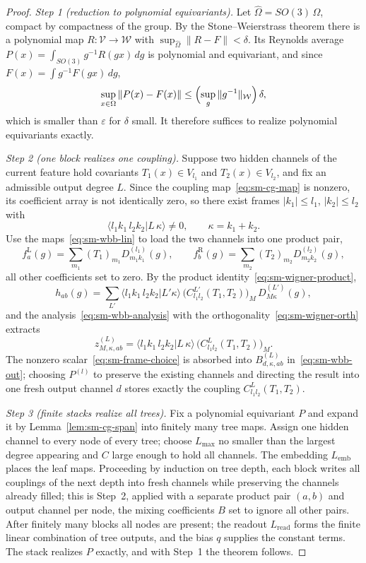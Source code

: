 \begin{proof}
    \emph{Step 1 (reduction to polynomial equivariants).}
    Let $\widehat\Omega=SO(3)\,\Omega$, compact by compactness of the group.
    By the Stone--Weierstrass theorem there is a polynomial map $R:\mathcal{V}\to\mathcal{W}$ with $\sup_{\widehat\Omega}\|R-F\|<\delta$.
    Its Reynolds average $P(x)=\int_{SO(3)}g^{-1}R(gx)\,dg$ is polynomial and equivariant, and since $F(x)=\int g^{-1}F(gx)\,dg$, \[ \sup_{x\in\Omega}\|P(x)-F(x)\| \le \Bigl(\sup_{g}\|g^{-1}\|_{\mathcal{W}}\Bigr)\,\delta , \] which is smaller than $\varepsilon$ for $\delta$ small.
    It therefore suffices to realize polynomial equivariants exactly.

    \emph{Step 2 (one block realizes one coupling).}
    Suppose two hidden channels of the current feature hold covariants $T_1(x)\in V_{l_1}$ and $T_2(x)\in V_{l_2}$, and fix an admissible output degree $L$.
    Since the coupling map~\eqref{eq:sm-cg-map} is nonzero, its coefficient array is not identically zero, so there exist frames $|k_1|\le l_1$, $|k_2|\le l_2$ with
    \begin{equation}
        \langle l_1 k_1\, l_2 k_2|L\,\kappa\rangle\neq0,
        \qquad \kappa=k_1+k_2 .
        \label{eq:sm-frame-choice}
    \end{equation}
    Use the maps~\eqref{eq:sm-wbb-lin} to load the two channels into one product pair, \[ f^{\mathrm{L}}_{a}(g)=\sum_{m_1}(T_1)_{m_1}D^{(l_1)}_{m_1k_1}(g), \qquad f^{\mathrm{R}}_{b}(g)=\sum_{m_2}(T_2)_{m_2}D^{(l_2)}_{m_2k_2}(g), \] all other coefficients set to zero.
    By the product identity~\eqref{eq:sm-wigner-product}, \[ h_{ab}(g) =\sum_{L'}\langle l_1 k_1\, l_2 k_2|L'\kappa\rangle\, \bigl(C^{L'}_{l_1l_2}(T_1,T_2)\bigr)_{M}\,D^{(L')}_{M\kappa}(g), \] and the analysis~\eqref{eq:sm-wbb-analysis} with the orthogonality~\eqref{eq:sm-wigner-orth} extracts \[ z^{(L)}_{M,\kappa,ab} =\langle l_1 k_1\, l_2 k_2|L\,\kappa\rangle\, \bigl(C^{L}_{l_1l_2}(T_1,T_2)\bigr)_{M}.
    \]
    The nonzero scalar~\eqref{eq:sm-frame-choice} is absorbed into $B^{(L)}_{d,\kappa,ab}$ in~\eqref{eq:sm-wbb-out}; choosing $P^{(l)}$ to preserve the existing channels and directing the result into one fresh output channel $d$ stores exactly the coupling $C^{L}_{l_1l_2}(T_1,T_2)$.

    \emph{Step 3 (finite stacks realize all trees).}
    Fix a polynomial equivariant $P$ and expand it by Lemma~\ref{lem:sm-cg-span} into finitely many tree maps.
    Assign one hidden channel to every node of every tree; choose $L_{\max}$ no smaller than the largest degree appearing and $C$ large enough to hold all channels.
    The embedding $L_{\mathrm{emb}}$ places the leaf maps.
    Proceeding by induction on tree depth, each block writes all couplings of the next depth into fresh channels while preserving the channels already filled; this is Step~2, applied with a separate product pair $(a,b)$ and output channel per node, the mixing coefficients $B$ set to ignore all other pairs.
    After finitely many blocks all nodes are present; the readout $L_{\mathrm{read}}$ forms the finite linear combination of tree outputs, and the bias $q$ supplies the constant terms.
    The stack realizes $P$ exactly, and with Step~1 the theorem follows.
\end{proof}

